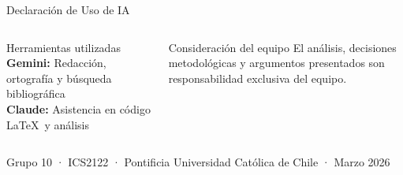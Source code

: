 \documentclass[10pt, aspectratio=169]{beamer}
\begin{document}
\begin{frame}{Declaración de Uso de IA}

  \begin{columns}[T]
      \begin{block}{Herramientas utilizadas}
        \footnotesize
        \vspace{4pt}
        \textbf{Gemini:} Redacción, ortografía y búsqueda bibliográfica\\[4pt]
        \textbf{Claude:} Asistencia en código \LaTeX\ y análisis
        \vspace{4pt}
      \end{block}
      \begin{alertblock}{Consideración del equipo}
        \footnotesize
        El análisis, decisiones metodológicas y argumentos presentados son responsabilidad exclusiva del equipo.
      \end{alertblock}
  \end{columns}

  \vspace{14pt}
  \centering\small\textcolor{ucgris}{Grupo 10 · ICS2122 · Pontificia Universidad Católica de Chile · Marzo 2026}

\end{frame}

\end{document}
